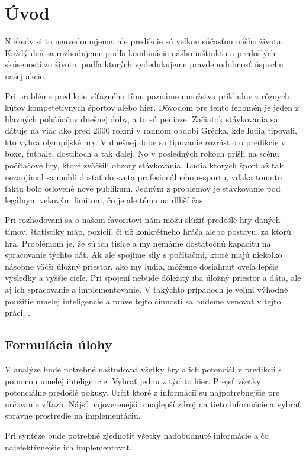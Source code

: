 
{}

\chapter*{Úvod}


Niekedy si to neuvedomujeme, ale predikcie sú veľkou súčasťou nášho života. Každý deň sa rozhodujeme podľa kombinácie nášho inštinktu a predošlých skúseností zo života, podľa ktorých vydedukujeme pravdepodobnosť úspechu našej akcie.
 
Pri probléme predikcie víťazného tímu poznáme množstvo príkladov z rôznych kútov kompetetívnych športov alebo hier. Dôvodom pre tento fenomén je jeden z hlavných poháňačov dnešnej doby, a to sú peniaze. Začiatok stávkovania sa dátuje na viac ako pred 2000 rokmi v rannom období Grécka, kde ľudia tipovali, kto vyhrá olympijské hry. V dnešnej dobe sa tipovanie rozrástlo o predikcie v boxe, futbale, dostihoch a tak ďalej. No v posledných rokoch prišli na scénu počítačové hry, ktoré zväčšili obzory stávkovania. Luďia ktorých šport až tak nezaujímal sa mohli dostať do sveta profesionálneho e-sportu, vďaka tomuto faktu bolo oslovené nové publikum. Jedným z problémov je stávkovanie pod legálnym vekovým limitom, čo je ale téma na dlhší čas. 

Pri rozhodovaní sa o našom favoritovi nám môžu slúžiť predošlé hry daných tímov, štatistiky máp, pozícií, či už konkrétneho hráča alebo postavu, za ktorú hrá. Problémom je, že sú ich tisíce a my nemáme dostatočnú kapacitu na spracovanie týchto dát. Ak ale spojíme sily s počítačmi, ktoré majú niekoľko násobne väčší úložný priestor, ako my ľudia, môžeme dosiahnuť oveľa lepšie výsledky a vyššie cieľe. Pri spojení nebude dôležitý iba úložný priestor a dáta, ale aj ich spracovanie a implementovanie. V takýchto prípadoch je veľmi výhodné použitie umelej inteligencie a práve tejto činnosti sa budeme venovať v tejto práci. 
.


\section*{Formulácia úlohy}

V analýze bude potrebné naštudovať všetky hry a ich potenciál v predikcii s pomocou umelej inteligencie. Vybrať jednu z týchto hier. Prejsť všetky potenciálne predošlé pokusy. Určiť ktoré z informácií su najpotrebnejšie pre určovanie víťaza. Nájsť najoverenejší a najlepší zdroj na tieto informácie a vybrať správne prostredie na implementáciu.

Pri syntéze bude potrebné zjednotiť všetky nadobudnuté informácie a čo najefektívnejšie ich implementovať.
